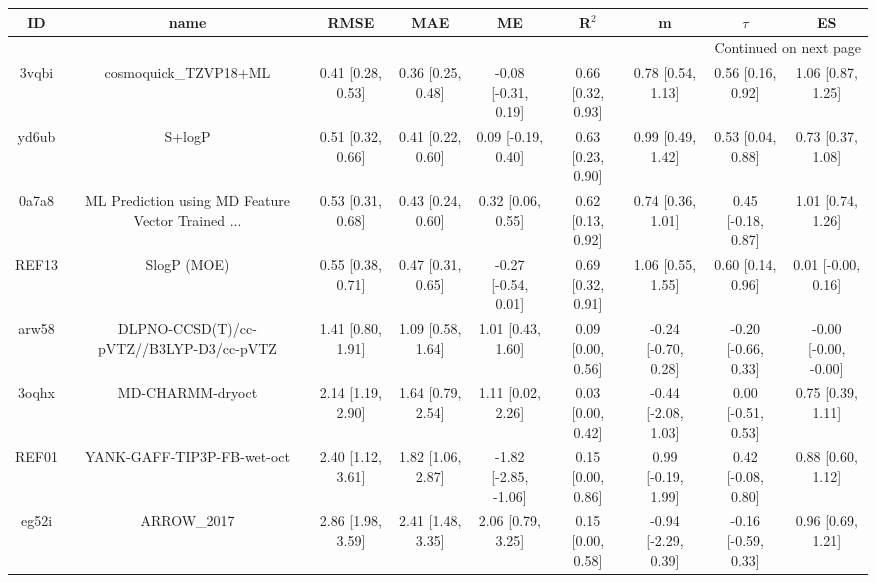 \documentclass{article}
\begin{document}
\begin{center}
\scriptsize
\begin{longtable}{|ccccccccc|}
\toprule
    ID &                                               name &               RMSE &                MAE &                    ME &              R$^2$ &                    m &               $\tau$ &                    ES \\
\midrule
\endhead
\midrule
\multicolumn{9}{r}{{Continued on next page}} \\
\midrule
\endfoot

\bottomrule
\endlastfoot
 3vqbi &                              cosmoquick\_TZVP18+ML &  0.41 [0.28, 0.53] &  0.36 [0.25, 0.48] &   -0.08 [-0.31, 0.19] &  0.66 [0.32, 0.93] &    0.78 [0.54, 1.13] &    0.56 [0.16, 0.92] &     1.06 [0.87, 1.25] \\
 yd6ub &                                             S+logP &  0.51 [0.32, 0.66] &  0.41 [0.22, 0.60] &    0.09 [-0.19, 0.40] &  0.63 [0.23, 0.90] &    0.99 [0.49, 1.42] &    0.53 [0.04, 0.88] &     0.73 [0.37, 1.08] \\
 0a7a8 &  ML Prediction using MD Feature Vector Trained ... &  0.53 [0.31, 0.68] &  0.43 [0.24, 0.60] &     0.32 [0.06, 0.55] &  0.62 [0.13, 0.92] &    0.74 [0.36, 1.01] &   0.45 [-0.18, 0.87] &     1.01 [0.74, 1.26] \\
 REF13 &                                        SlogP (MOE) &  0.55 [0.38, 0.71] &  0.47 [0.31, 0.65] &   -0.27 [-0.54, 0.01] &  0.69 [0.32, 0.91] &    1.06 [0.55, 1.55] &    0.60 [0.14, 0.96] &    0.01 [-0.00, 0.16] \\
 arw58 &            DLPNO-CCSD(T)/cc-pVTZ//B3LYP-D3/cc-pVTZ &  1.41 [0.80, 1.91] &  1.09 [0.58, 1.64] &     1.01 [0.43, 1.60] &  0.09 [0.00, 0.56] &  -0.24 [-0.70, 0.28] &  -0.20 [-0.66, 0.33] &  -0.00 [-0.00, -0.00] \\
 3oqhx &                                   MD-CHARMM-dryoct &  2.14 [1.19, 2.90] &  1.64 [0.79, 2.54] &     1.11 [0.02, 2.26] &  0.03 [0.00, 0.42] &  -0.44 [-2.08, 1.03] &   0.00 [-0.51, 0.53] &     0.75 [0.39, 1.11] \\
 REF01 &                         YANK-GAFF-TIP3P-FB-wet-oct &  2.40 [1.12, 3.61] &  1.82 [1.06, 2.87] &  -1.82 [-2.85, -1.06] &  0.15 [0.00, 0.86] &   0.99 [-0.19, 1.99] &   0.42 [-0.08, 0.80] &     0.88 [0.60, 1.12] \\
 eg52i &                                        ARROW\_2017 &  2.86 [1.98, 3.59] &  2.41 [1.48, 3.35] &     2.06 [0.79, 3.25] &  0.15 [0.00, 0.58] &  -0.94 [-2.29, 0.39] &  -0.16 [-0.59, 0.33] &     0.96 [0.69, 1.21] \\
\end{longtable}
\end{center}
\end{document}
